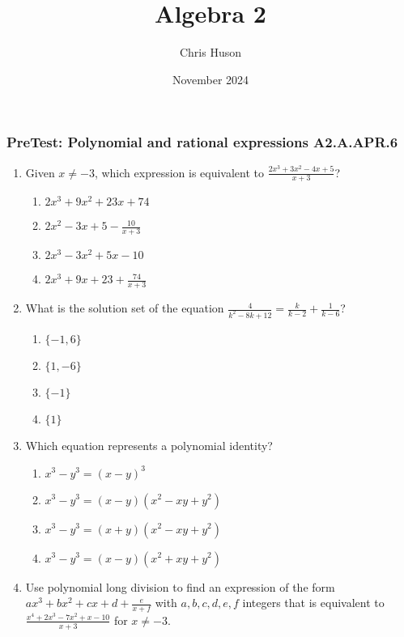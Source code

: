 \documentclass[12pt, twoside]{article}
\title{Algebra 2}
\author{Chris Huson}
\date{November 2024}
\begin{document}
\subsubsection*{PreTest: Polynomial and rational expressions \hfill A2.A.APR.6}
\begin{enumerate}[itemsep=0.5cm]

\item Given $x \ne -3$, which expression is equivalent to $\displaystyle \frac{2x^3 + 3x^2 - 4x + 5}{x+3}$? %
    \begin{enumerate}
        \item $\displaystyle 2x^3 + 9x^2 + 23x + 74$
        \item $\displaystyle 2x^2 - 3x + 5 - \frac{10}{x+3}$
        \item $\displaystyle 2x^3 -3x^2 + 5x - 10$
        \item $\displaystyle 2x^3 + 9x + 23 + \frac{74}{x+3}$
    \end{enumerate}\vspace{3cm}

\item What is the solution set of the equation \(\displaystyle \frac{4}{k^2-8k+12} = \frac{k}{k-2} + \frac{1}{k-6} \)? %
    \begin{enumerate}
        \item \(\{-1,6\}\)
        \item \(\{1, -6\}\)
        \item \(\{-1\}\)
        \item \(\{1\}\)
    \end{enumerate} \vspace{3cm}

\item Which equation represents a polynomial identity? %
\begin{enumerate}
    \item \(x^3 - y^3 = (x - y)^3\)
    \item \(x^3 - y^3 = (x - y)(x^2 - xy + y^2)\)
    \item \(x^3 - y^3 = (x + y)(x^2 - xy + y^2)\)
    \item \(x^3 - y^3 = (x - y)(x^2 + xy + y^2)\)
\end{enumerate}

\newpage
\item Use polynomial long division to find an expression of the form $ax^3 + bx^2 +cx +d +\frac{e}{x+f}$ with $a,b,c,d, e, f$ integers that is equivalent to $\displaystyle \frac{x^4 + 2x^3 - 7x^2 + x - 10}{x + 3}
$ for $x \neq -3$.
\vspace{10cm}


\end{enumerate}
\end{document}
